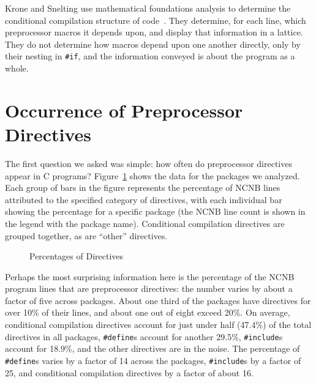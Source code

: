Krone and Snelting use mathematical foundations analysis to determine the
conditional compilation structure of code~\cite{Krone94}.  They determine,
for each line, which preprocessor macros it depends upon, and display that
information in a lattice.  They do not determine how macros depend upon one
another directly, only by their nesting in \verb|#if|, and the information
conveyed is about the program as a whole.


\section{Occurrence of Preprocessor Directives}\label{sec:directives}

The first question we asked was simple: how often do
preprocessor directives appear in C programs?
Figure~\ref{fig:directives} shows the data for the packages we
analyzed.  Each group of bars in the figure represents the percentage of
NCNB lines attributed to the specified category of directives, with each
individual bar showing the percentage for a specific package (the NCNB
line count is shown in the legend with the package name).  Conditional
compilation directives are grouped together, as are ``other'' directives.


\begin{figure}
\vspace{8in}
\caption{Percentages of Directives\label{fig:directives}}
\end{figure}

Perhaps the most surprising information here is the percentage of the
NCNB program lines that are preprocessor directives: the number varies
by about a factor of five across packages.  About one third of the
packages have directives for over 10\% of their lines, and about one
out of eight exceed 20\%.  On average, conditional compilation
directives account for just under half (47.4\%) of the total
directives in all packages, \verb+#define+s account for another
29.5\%, \verb+#include+s account for 18.9\%, and the other directives
are in the noise.
The percentage of \verb+#define+s varies by a factor of 14
across the packages, \verb+#include+s by a factor of 25, and
conditional compilation directives by a factor of about 16.


